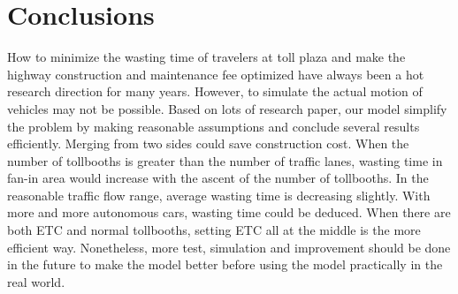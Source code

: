 \section{Conclusions}
How to minimize the wasting time of travelers at toll plaza and make the highway construction and maintenance fee optimized have always been a hot research direction for many years. However, to simulate the actual motion of vehicles may not be possible. Based on lots of research paper, our model simplify the problem by making reasonable assumptions and conclude several results efficiently. Merging from two sides could save construction cost. When the number of tollbooths is greater than the number of traffic lanes, wasting time in fan-in area would increase with the ascent of the number of tollbooths. In the reasonable traffic flow range, average wasting time is decreasing slightly. With more and more autonomous cars, wasting time could be deduced. When there are both ETC and normal tollbooths, setting ETC all at the middle is the more efficient way. Nonetheless, more test, simulation and improvement should be done in the future to make the model better before using the model practically in the real world.


